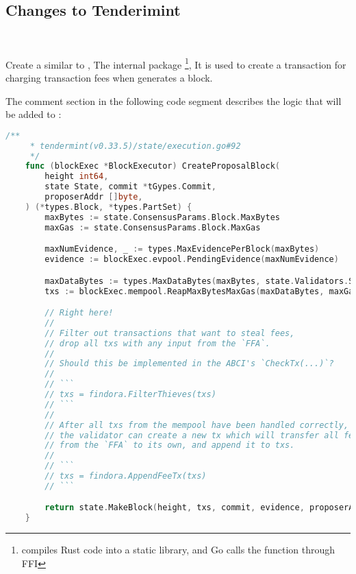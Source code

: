 \clearpage

\subsection{Changes to Tenderimint} \label{tendermint:CreateProposalBlock}

~\par

Create a  similar to ,
The internal package \footnote{ compiles Rust code into a static library,
and Go calls the function through FFI},
It is used to create a transaction for charging transaction fees
when  generates a block.

The comment section in the following code segment describes the logic
that will be added to :

\begin{lstlisting}[language=go]
    /**
     * tendermint(v0.33.5)/state/execution.go#92
     */
    func (blockExec *BlockExecutor) CreateProposalBlock(
        height int64,
        state State, commit *tGypes.Commit,
        proposerAddr []byte,
    ) (*types.Block, *types.PartSet) {
        maxBytes := state.ConsensusParams.Block.MaxBytes
        maxGas := state.ConsensusParams.Block.MaxGas

        maxNumEvidence, _ := types.MaxEvidencePerBlock(maxBytes)
        evidence := blockExec.evpool.PendingEvidence(maxNumEvidence)

        maxDataBytes := types.MaxDataBytes(maxBytes, state.Validators.Size(), len(evidence))
        txs := blockExec.mempool.ReapMaxBytesMaxGas(maxDataBytes, maxGas)

        // Right here!
        //
        // Filter out transactions that want to steal fees,
        // drop all txs with any input from the `FFA`.
        //
        // Should this be implemented in the ABCI's `CheckTx(...)`?
        //
        // ```
        // txs = findora.FilterThieves(txs)
        // ```
        //
        // After all txs from the mempool have been handled correctly,
        // the validator can create a new tx which will transfer all fees
        // from the `FFA` to its own, and append it to txs.
        //
        // ```
        // txs = findora.AppendFeeTx(txs)
        // ```

        return state.MakeBlock(height, txs, commit, evidence, proposerAddr)
    }
\end{lstlisting}
